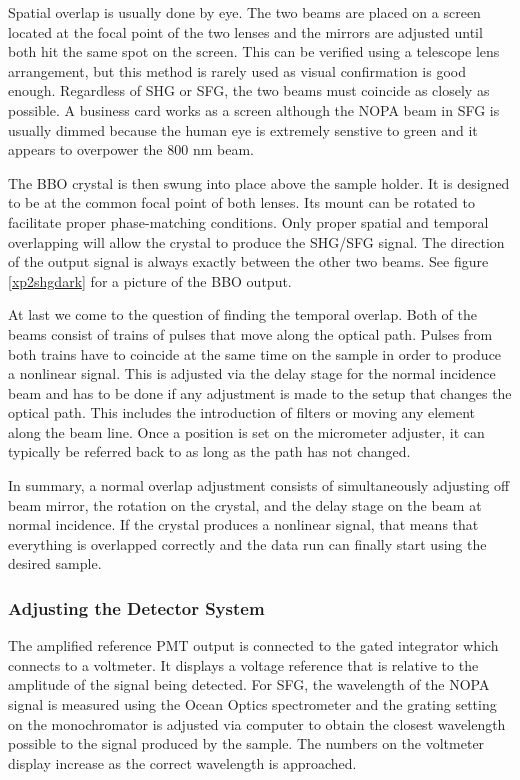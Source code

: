 Spatial overlap is usually done by eye. The two beams are placed on a screen located at the focal point of the two lenses and the mirrors are adjusted until both hit the same spot on the screen. This can be verified using a telescope lens arrangement, but this method is rarely used as visual confirmation is good enough. Regardless of SHG or SFG, the two beams must coincide as closely as possible. A business card works as a screen although the NOPA beam in SFG is usually dimmed because the human eye is extremely senstive to green and it appears to overpower the 800 nm beam.

The BBO crystal is then swung into place above the sample holder. It is designed to be at the common focal point of both lenses. Its mount can be rotated to facilitate proper phase-matching conditions. Only proper spatial and temporal overlapping will allow the crystal to produce the SHG/SFG signal. The direction of the output signal is always exactly between the other two beams. See figure \ref{xp2shgdark} for a picture of the BBO output.

At last we come to the question of finding the temporal overlap. Both of the beams consist of trains of pulses that move along the optical path. Pulses from both trains have to coincide at the same time on the sample in order to produce a nonlinear signal. This is adjusted via the delay stage for the normal incidence beam and has to be done if any adjustment is made to the setup that changes the optical path. This includes the introduction of filters or moving any element along the beam line. Once a position is set on the micrometer adjuster, it can typically be referred back to as long as the path has not changed.

In summary, a normal overlap adjustment consists of simultaneously adjusting off beam mirror, the rotation on the crystal, and the delay stage on the beam at normal incidence. If the crystal produces a nonlinear signal, that means that everything is overlapped correctly and the data run can finally start using the desired sample.

\subsubsection{Adjusting the Detector System}
The amplified reference PMT output is connected to the gated integrator which connects to a voltmeter. It displays a voltage reference that is relative to the amplitude of the signal being detected. For SFG, the wavelength of the NOPA signal is measured using the Ocean Optics spectrometer and the grating setting on the monochromator is adjusted via computer to obtain the closest wavelength possible to the signal produced by the sample. The numbers on the voltmeter display increase as the correct wavelength is approached.

